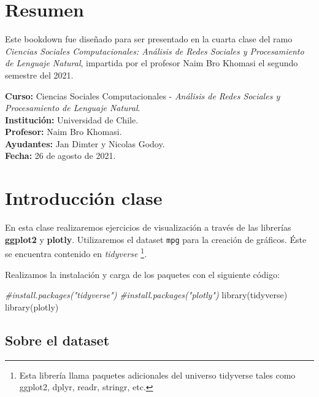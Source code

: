 \documentclass[
]{book}
\author{}
\date{\vspace{-2.5em}}
\newenvironment{Shaded}{\begin{snugshade}}{\end{snugshade}}
\newcommand{\CommentTok}[1]{\textcolor[rgb]{0.56,0.35,0.01}{\textit{#1}}}
\newcommand{\FunctionTok}[1]{\textcolor[rgb]{0.00,0.00,0.00}{#1}}
\newcommand{\NormalTok}[1]{#1}
\begin{document}
{
\setcounter{tocdepth}{1}
\tableofcontents
}
\hypertarget{resumen}{%
\chapter{Resumen}\label{resumen}}

Este bookdown fue diseñado para ser presentado en la cuarta clase del ramo \emph{Ciencias Sociales Computacionales: Análisis de Redes Sociales y Procesamiento de Lenguaje Natural}, impartida por el profesor Naim Bro Khomasi el segundo semestre del 2021.

\textbf{Curso:} Ciencias Sociales Computacionales - \emph{Análisis de Redes Sociales y Procesamiento de Lenguaje Natural}.\\
\textbf{Institución:} Universidad de Chile.\\
\textbf{Profesor:} Naim Bro Khomasi.\\
\textbf{Ayudantes:} Jan Dimter y Nicolas Godoy.\\
\textbf{Fecha:} 26 de agosto de 2021.

\hypertarget{introducciuxf3n-clase}{%
\chapter{Introducción clase}\label{introducciuxf3n-clase}}

En esta clase realizaremos ejercicios de visualización a través de las librerías \textbf{ggplot2} y \textbf{plotly}. Utilizaremos el dataset \texttt{mpg} para la creación de gráficos. Éste se encuentra contenido en \emph{tidyverse} \footnote{Esta librería llama paquetes adicionales del universo tidyverse tales como ggplot2, dplyr, readr, stringr, etc.}\emph{.}

Realizamos la instalación y carga de los paquetes con el siguiente código:\\

\begin{Shaded}
\begin{Highlighting}[]
\CommentTok{\#install.packages("tidyverse")}
\CommentTok{\#install.packages("plotly")}
\FunctionTok{library}\NormalTok{(tidyverse)}
\FunctionTok{library}\NormalTok{(plotly)}
\end{Highlighting}
\end{Shaded}

\hypertarget{sobre-el-dataset}{%
\section{Sobre el dataset}\label{sobre-el-dataset}}
\end{document}
